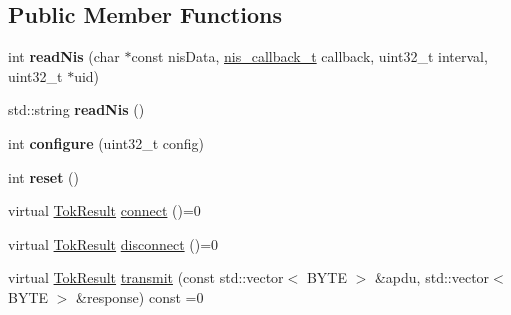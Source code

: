 \subsection*{Public Member Functions}
\begin{DoxyCompactItemize}
\item 
\hypertarget{classcie_1_1nis_1_1Token_ae677403b3b8074b908cb416741f93e9e}{int {\bfseries read\-Nis} (char $\ast$const nis\-Data, \hyperlink{nis__types_8h_a01a69b218db702baa14290be05ef112d}{nis\-\_\-callback\-\_\-t} callback, uint32\-\_\-t interval, uint32\-\_\-t $\ast$uid)}\label{classcie_1_1nis_1_1Token_ae677403b3b8074b908cb416741f93e9e}

\item 
\hypertarget{classcie_1_1nis_1_1Token_a3c246d7e4a06c864bcadc6db97d1870e}{std\-::string {\bfseries read\-Nis} ()}\label{classcie_1_1nis_1_1Token_a3c246d7e4a06c864bcadc6db97d1870e}

\item 
\hypertarget{classcie_1_1nis_1_1Token_ab9147907b6d02c2361c2df2212d17a4d}{int {\bfseries configure} (uint32\-\_\-t config)}\label{classcie_1_1nis_1_1Token_ab9147907b6d02c2361c2df2212d17a4d}

\item 
\hypertarget{classcie_1_1nis_1_1Token_a249238a0e7a79237d443bb42bee06b6f}{int {\bfseries reset} ()}\label{classcie_1_1nis_1_1Token_a249238a0e7a79237d443bb42bee06b6f}

\item 
virtual \hyperlink{nis__types_8h_a6ef53483e8ce2f8bc58bd1f75b3d0b38}{Tok\-Result} \hyperlink{classcie_1_1nis_1_1Token_ab7a55406f6b9b15a39d70e64bab0042f}{connect} ()=0
\item 
virtual \hyperlink{nis__types_8h_a6ef53483e8ce2f8bc58bd1f75b3d0b38}{Tok\-Result} \hyperlink{classcie_1_1nis_1_1Token_a851b111864dade8826daa21920fa7cdf}{disconnect} ()=0
\item 
virtual \hyperlink{nis__types_8h_a6ef53483e8ce2f8bc58bd1f75b3d0b38}{Tok\-Result} \hyperlink{classcie_1_1nis_1_1Token_a90c1d8936133fc35b1826b7eebbd13ff}{transmit} (const std\-::vector$<$ B\-Y\-T\-E $>$ \&apdu, std\-::vector$<$ B\-Y\-T\-E $>$ \&response) const =0
\end{DoxyCompactItemize}


